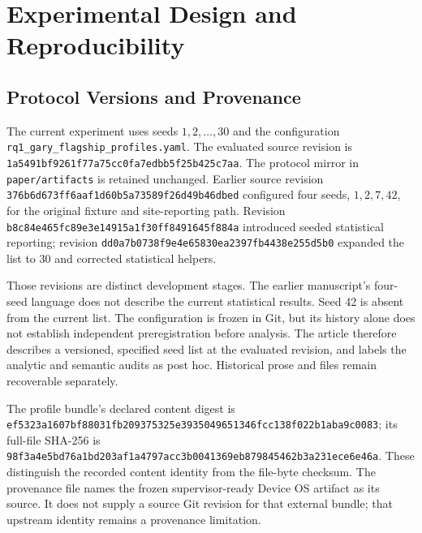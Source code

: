 \section{Experimental Design and Reproducibility}
\label{sec:design}
\subsection{Protocol Versions and Provenance}
The current experiment uses seeds $1,2,\ldots,30$ and the configuration \texttt{rq1\_gary\_flagship\_profiles.yaml}. The evaluated source revision is \texttt{1a5491bf}\allowbreak\texttt{9261f77a}\allowbreak\texttt{75cc0fa7}\allowbreak\texttt{edbb5f25}\allowbreak\texttt{b425c7aa}. The protocol mirror in \texttt{paper/artifacts} is retained unchanged. Earlier source revision \texttt{376b6d67}\allowbreak\texttt{3ff6aaf1}\allowbreak\texttt{d60b5a73}\allowbreak\texttt{589f26d4}\allowbreak\texttt{9b46dbed} configured four seeds, $1,2,7,42$, for the original fixture and site-reporting path. Revision \texttt{b8c84e46}\allowbreak\texttt{5fc89e3e}\allowbreak\texttt{14915a1f}\allowbreak\texttt{30ff8491}\allowbreak\texttt{645f884a} introduced seeded statistical reporting; revision \texttt{dd0a7b07}\allowbreak\texttt{38f9e4e6}\allowbreak\texttt{5830ea23}\allowbreak\texttt{97fb4438}\allowbreak\texttt{e255d5b0} expanded the list to 30 and corrected statistical helpers.

Those revisions are distinct development stages. The earlier manuscript's four-seed language does not describe the current statistical results. Seed 42 is absent from the current list. The configuration is frozen in Git, but its history alone does not establish independent preregistration before analysis. The article therefore describes a versioned, specified seed list at the evaluated revision, and labels the analytic and semantic audits as post hoc. Historical prose and files remain recoverable separately.

The profile bundle's declared content digest is \texttt{ef5323a1}\allowbreak\texttt{607bf880}\allowbreak\texttt{31fb2093}\allowbreak\texttt{75325e39}\allowbreak\texttt{35049651}\allowbreak\texttt{346fcc13}\allowbreak\texttt{8f022b1a}\allowbreak\texttt{ba9c0083}; its full-file SHA-256 is \texttt{98f3a4e5}\allowbreak\texttt{bd76a1bd}\allowbreak\texttt{203af1a4}\allowbreak\texttt{797acc3b}\allowbreak\texttt{0041369e}\allowbreak\texttt{b8798454}\allowbreak\texttt{62b3a231}\allowbreak\texttt{ece6e46a}. These distinguish the recorded content identity from the file-byte checksum. The provenance file names the frozen supervisor-ready Device OS artifact as its source. It does not supply a source Git revision for that external bundle; that upstream identity remains a provenance limitation.

